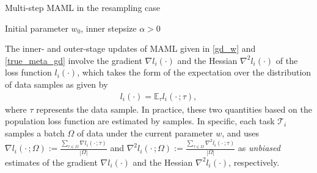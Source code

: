 \documentclass{osudissert96}
\begin{document}
\begin{algorithm}[t]
	\caption{Multi-step MAML in the resampling case} 
	\label{alg:online}
	\begin{algorithmic}[1]
		  Initial parameter $w_0$, inner stepsize $\alpha>0$	
		\ENDFOR
		\ENDFOR
		\ENDFOR
	\end{algorithmic}
	\end{algorithm}


The inner- and outer-stage updates of MAML given in \cref{gd_w} and \cref{true_meta_gd} involve the gradient $\nabla l_i(\cdot)$ %
 and the Hessian $\nabla^2 l_i(\cdot)$ of the loss function $l_i(\cdot)$, which takes the form of the expectation over the distribution of data samples as given by 
\begin{align}\label{fiw}
l_i(\cdot) = \mathbb{E}_{\tau} l_i(\cdot\,; \tau),
\end{align} 
where $\tau$ represents the data sample. In practice, these two quantities based on the population loss function are estimated by samples. In specific, each task $\mathcal{T}_i$ samples a batch $\Omega$ of data under the current parameter $w$, and uses $\nabla l_i(\cdot\,; \Omega):= \frac{\sum_{\tau \in \Omega} \nabla l_i(\cdot\,; \tau)}{|\Omega|} $  and $\nabla^2 l_i(\cdot\,; \Omega):= \frac{\sum_{\tau \in \Omega} \nabla^2 l_i(\cdot\,; \tau)}{|\Omega|} $ as {\em unbiased} estimates of  the gradient $\nabla l_i(\cdot)$ and the Hessian $\nabla^2 l_i(\cdot)$, respectively. 
\end{document}
